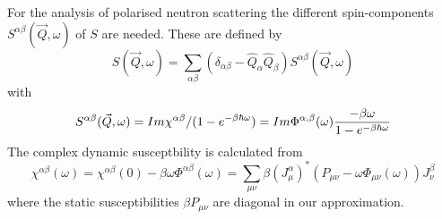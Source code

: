 For the analysis of polarised neutron scattering the different
spin-components $S^{\alpha\beta}(\vec Q,\omega)$ of $S$ are needed. 
These are defined by
$$
S(\vec Q,\omega)= \sum_{\alpha\beta}(\delta_{\alpha\beta} 
- \hat Q_\alpha \hat Q_\beta)S^{\alpha\beta}(\vec Q,\omega)
$$
with
$$
S^{\alpha\beta}(\vec Q,\omega)=
Im \chi^{\alpha\beta}/(1-e^{-\beta \hbar \omega})=
Im \Phi^{\alpha,\beta}(\omega){-\beta \omega \over 1-e^{-\beta \hbar \omega}} 
$$
The complex dynamic susceptbility is calculated from
$$
\chi^{\alpha\beta}(\omega)= \chi^{\alpha\beta}(0)-\beta \omega
\Phi^{\alpha\beta}(\omega)= \sum_{\mu\nu}\beta (J^\alpha_\mu)^*(P_{\mu\nu}-\omega
\Phi_{\mu\nu}(\omega ))J^\beta_\nu
$$
where the static susceptibilities $\beta P_{\mu\nu}$ are diagonal in our
approximation.  

\vfill
\eject
\parindent=0pt
